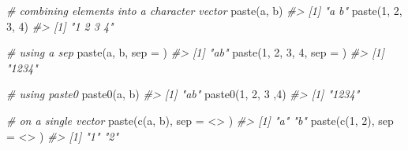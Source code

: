 \documentclass[
]{book}
\newenvironment{Shaded}{\begin{snugshade}}{\end{snugshade}}
\newcommand{\AttributeTok}[1]{\textcolor[rgb]{0.77,0.63,0.00}{#1}}
\newcommand{\CommentTok}[1]{\textcolor[rgb]{0.56,0.35,0.01}{\textit{#1}}}
\newcommand{\DecValTok}[1]{\textcolor[rgb]{0.00,0.00,0.81}{#1}}
\newcommand{\FunctionTok}[1]{\textcolor[rgb]{0.00,0.00,0.00}{#1}}
\newcommand{\NormalTok}[1]{#1}
\newcommand{\StringTok}[1]{\textcolor[rgb]{0.31,0.60,0.02}{#1}}
\begin{document}
\begin{Shaded}
\begin{Highlighting}[]
\CommentTok{\# combining elements into a character vector}
\FunctionTok{paste}\NormalTok{(}\StringTok{\textquotesingle{}a\textquotesingle{}}\NormalTok{, }\StringTok{\textquotesingle{}b\textquotesingle{}}\NormalTok{)}
\CommentTok{\#\textgreater{} [1] "a b"}
\FunctionTok{paste}\NormalTok{(}\DecValTok{1}\NormalTok{, }\DecValTok{2}\NormalTok{, }\DecValTok{3}\NormalTok{, }\DecValTok{4}\NormalTok{)}
\CommentTok{\#\textgreater{} [1] "1 2 3 4"}


\CommentTok{\# using a sep}
\FunctionTok{paste}\NormalTok{(}\StringTok{\textquotesingle{}a\textquotesingle{}}\NormalTok{, }\StringTok{\textquotesingle{}b\textquotesingle{}}\NormalTok{, }\AttributeTok{sep =} \StringTok{\textquotesingle{}\textquotesingle{}}\NormalTok{)}
\CommentTok{\#\textgreater{} [1] "ab"}
\FunctionTok{paste}\NormalTok{(}\DecValTok{1}\NormalTok{, }\DecValTok{2}\NormalTok{, }\DecValTok{3}\NormalTok{, }\DecValTok{4}\NormalTok{, }\AttributeTok{sep =} \StringTok{\textquotesingle{}\textquotesingle{}}\NormalTok{)}
\CommentTok{\#\textgreater{} [1] "1234"}


\CommentTok{\# using paste0}
\FunctionTok{paste0}\NormalTok{(}\StringTok{\textquotesingle{}a\textquotesingle{}}\NormalTok{, }\StringTok{\textquotesingle{}b\textquotesingle{}}\NormalTok{)}
\CommentTok{\#\textgreater{} [1] "ab"}
\FunctionTok{paste0}\NormalTok{(}\DecValTok{1}\NormalTok{, }\DecValTok{2}\NormalTok{, }\DecValTok{3}\NormalTok{ ,}\DecValTok{4}\NormalTok{)}
\CommentTok{\#\textgreater{} [1] "1234"}

\CommentTok{\# on a single vector}
\FunctionTok{paste}\NormalTok{(}\FunctionTok{c}\NormalTok{(}\StringTok{\textquotesingle{}a\textquotesingle{}}\NormalTok{, }\StringTok{\textquotesingle{}b\textquotesingle{}}\NormalTok{), }\AttributeTok{sep =} \StringTok{\textquotesingle{} \textless{}\textgreater{} \textquotesingle{}}\NormalTok{)}
\CommentTok{\#\textgreater{} [1] "a" "b"}
\FunctionTok{paste}\NormalTok{(}\FunctionTok{c}\NormalTok{(}\DecValTok{1}\NormalTok{, }\DecValTok{2}\NormalTok{), }\AttributeTok{sep =} \StringTok{\textquotesingle{} \textless{}\textgreater{} \textquotesingle{}}\NormalTok{)}
\CommentTok{\#\textgreater{} [1] "1" "2"}


\end{Highlighting}
\end{Shaded}
\end{document}
